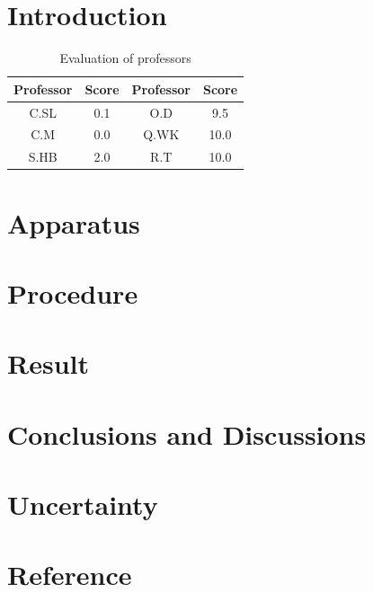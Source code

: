 \documentclass[12pt,a4paper]{article}
\begin{document}
\hfill

\clearpage

\tableofcontents
\clearpage

\section{Introduction}
\begin{table}[H]
\centering
\caption{Evaluation of professors}
\begin{tabular}{|c|c||c|c|}
\hline
\textbf{Professor} & \textbf{Score} & \textbf{Professor} & \textbf{Score} \\
\hline
C.SL & 0.1 & O.D & 9.5 \\
\hline
C.M & 0.0 & Q.WK & 10.0 \\
\hline
S.HB & 2.0 & R.T & 10.0 \\
\hline
\end{tabular}
\end{table}

\clearpage

\section{Apparatus}

\clearpage

\section{Procedure}

\clearpage

\section{Result}

\clearpage

\section{Conclusions and Discussions}

\clearpage

\setcounter{section}{0}
\renewcommand{\thesection}{\Alph{section}.}

\section{Uncertainty}

\clearpage

\section{Reference}

\clearpage
\end{document}
